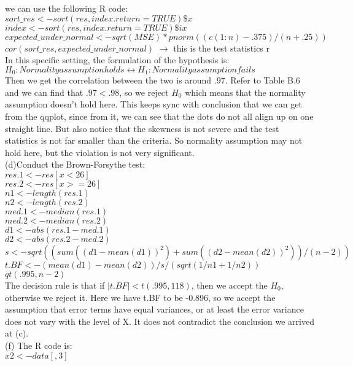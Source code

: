 \documentclass[12pt]{article}
\begin{document}
{we can use the following R code:\\
$sort\_res <- sort(res,index.return=TRUE)\$x$\\
$index <- sort(res,index.return=TRUE)\$ix$\\
$expected\_under\_normal <- sqrt(MSE)*pnorm((c(1:n)-.375)/(n+.25))$\\
$cor(sort\_res,expected\_under\_normal)$ $\to$ this is the test statistics r\\
In this specific setting, the formulation of the hypothesis is:\\
$H_0: Normality assumption holds \leftrightarrow H_1: Normality assumption fails$\\
Then we get the correlation between the two is around .97. Refer to Table B.6 and we can find that $.97<.98$, so we reject $H_0$ which means that the normality assumption doesn't hold here. This
keeps sync with conclusion that we can get from the qqplot, since from it, we can see that the dots do not all align up on one straight line. But also notice that the skewness is not severe and the
test statistics is not far smaller than the criteria. So normality assumption may not hold here, but the violation is not very significant.\\
(d)Conduct the Brown-Forsythe test:\\
$res.1 <- res[x<26]$\\
$res.2 <- res[x>=26]$\\
$n1 <- length(res.1)$\\
$n2 <- length(res.2)$\\
$med.1 <- median(res.1)$\\
$med.2 <- median(res.2)$\\
$d1 <- abs(res.1-med.1)$\\
$d2 <- abs(res.2-med.2)$\\
$s <- sqrt((sum((d1-mean(d1))^2)+sum((d2-mean(d2))^2))/(n-2))$\\
$t.BF <- (mean(d1)-mean(d2))/s/(sqrt(1/n1+1/n2))$\\
$qt(.995,n-2)$\\
The decision rule is that if $|t.BF| < t(.995,118)$, then we accept the $H_0$, otherwise we reject it. Here we have t.BF to be -0.896, so we accept the assumption that error terms have equal variances, or at least
the error variance does not vary with the level of X. It does not contradict the conclusion we arrived at (c).\\
(f)
The R code is:\\
$x2 <- data[,3]$\\
}
\end{document}
